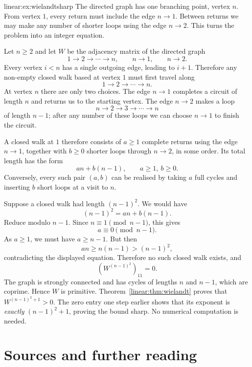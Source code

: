 \begin{solution}{linear:ex:wielandtsharp}
\idea The directed graph has one branching point, vertex $n$. From vertex $1$, every return must include the edge $n\to1$. Between returns we may make any number of shorter loops using the edge $n\to2$. This turns the problem into an integer equation.

\writeup Let $n\ge2$ and let $W$ be the adjacency matrix of the directed graph
\[
1\to2\to\cdots\to n,\qquad n\to1,\qquad n\to2.
\]
Every vertex $i<n$ has a single outgoing edge, leading to $i+1$. Therefore any non-empty closed walk based at vertex $1$ must first travel along
\[
1\to2\to\cdots\to n.
\]
At vertex $n$ there are only two choices. The edge $n\to1$ completes a circuit of length $n$ and returns us to the starting vertex. The edge $n\to2$ makes a loop
\[
n\to2\to3\to\cdots\to n
\]
of length $n-1$; after any number of these loops we can choose $n\to1$ to finish the circuit.

A closed walk at $1$ therefore consists of $a\ge1$ complete returns using the edge $n\to1$, together with $b\ge0$ shorter loops through $n\to2$, in some order. Its total length has the form
\[
\boxed{an+b(n-1),\qquad a\ge1,\ b\ge0}.
\]
Conversely, every such pair $(a,b)$ can be realised by taking $a$ full cycles and inserting $b$ short loops at a visit to $n$.

Suppose a closed walk had length $(n-1)^2$. We would have
\[
(n-1)^2=an+b(n-1).
\]
Reduce modulo $n-1$. Since $n\equiv1\pmod{n-1}$, this gives
\[
a\equiv0\pmod{n-1}.
\]
As $a\ge1$, we must have $a\ge n-1$. But then
\[
an\ge n(n-1)>(n-1)^2,
\]
contradicting the displayed equation. Therefore no such closed walk exists, and
\[
\boxed{(W^{(n-1)^2})_{11}=0}.
\]
The graph is strongly connected and has cycles of lengths $n$ and $n-1$, which are coprime. Hence $W$ is primitive. Theorem~\ref{linear:thm:wielandt} proves that $W^{(n-1)^2+1}>0$. The zero entry one step earlier shows that its exponent is \emph{exactly} $(n-1)^2+1$, proving the bound sharp. No numerical computation is needed.
\end{solution}

\section*{Sources and further reading}


